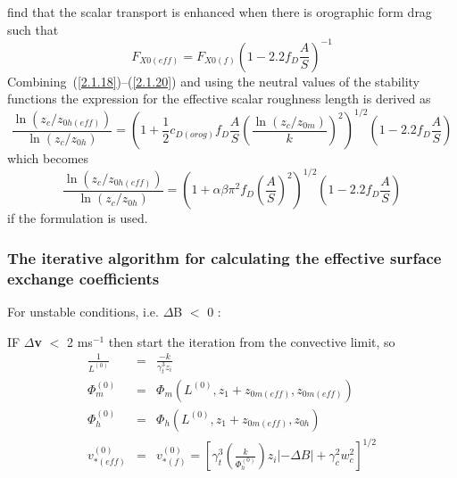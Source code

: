 \documentclass{UMDP_article}
\begin{document}
\cite{hewer1998} find that the scalar transport is enhanced when there
is orographic form drag such that
\begin{equation}
  F_{X0(eff)} =  F_{X0(f)}  {\left( {1 - 2.2  f_D \frac{A}{S}} \right)}^{-1}
  \label{2.1.20}
\end{equation}
Combining~(\ref{2.1.18})--(\ref{2.1.20}) and using the neutral values
of the stability functions the expression for the effective scalar
roughness length is derived as
\begin{equation}
  \frac{\ln (  z_c /  z_{0h(eff)} )}{\ln (  z_c /  z_{0h} )} =  {\left( {1 + \frac{1}{2}  c_{D(orog)}  f_D \frac{A}{S}  {\left( {\frac{\ln ( z_c /  z_{0m} )}{k}} \right)}^2 } \right)}^{1/2} \left( {1 - 2.2  f_D \frac{A}{S}} \right)
  \label{2.1.21)}
\end{equation}
which becomes
\begin{equation}
  \frac{\ln (  z_c /  z_{0h(eff)} )}{\ln (  z_c /  z_{0h} )} =  {\left( {1 + \alpha \beta  \pi ^2  f_D  {\left( {\frac{A}{S}} \right)}^2 } \right)}^{1/2} \left( {1 - 2.2  f_D \frac{A}{S}} \right)
  \label{2.1.22}
\end{equation}
if the \cite{wood93} formulation is used.

\subsubsection{The iterative algorithm for calculating the effective
  surface exchange coefficients}\label{section_2.2}

For unstable conditions, i.e. $\Delta $B $<$ 0 :

IF $\Delta $\textbf{v} $<$ 2 ms$^{-1}$ then start the iteration from
the convective limit, so
\begin{eqnarray}
  \frac{1}{ L^{(0)} }&=&\frac{-k}{ \gamma _t^3  z_i }
  \label{2.2.1} \\
  \Phi _m^{(0)}&=& \Phi _m ( L^{(0)} ,  z_1 +  z_{0m(eff)} ,  z_{0m(eff)} )
  \label{2.2.2} \\
  \Phi _h^{(0)}&=& \Phi _h ( L^{(0)} ,  z_1 +  z_{0m(eff)} ,  z_{0h} )
  \label{2.2.3} \\
  v_{\ast (eff)}^{(0)}&=& v_{\ast (f)}^{(0)} =  {\left[ {  \gamma _t^3 \left( {\frac{k}{ \Phi _h^{(0)} }} \right)  z_i \left| {-\Delta B} \right| +  \gamma _c^2  w_c^2 } \right]}^{ 1/2}
  \label{(2.2.4}
\end{eqnarray}
\end{document}
